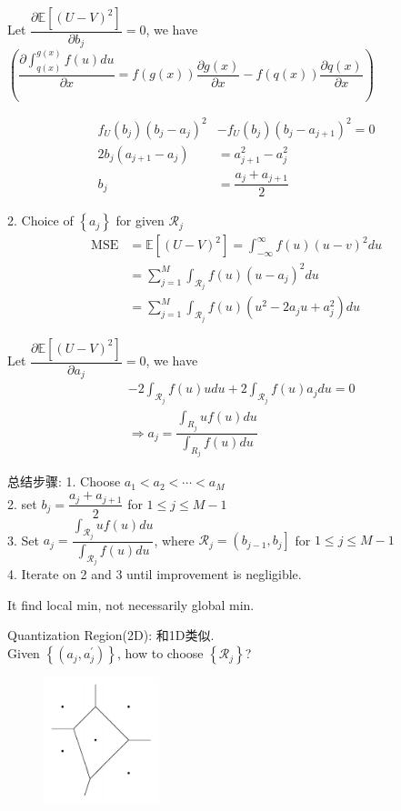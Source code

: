 Let $\dfrac{\partial \mathbb{E}\left[(U-V)^2\right]}{\partial b_j}=0$, we have $\left(\dfrac{\partial \int_{q(x)}^{g(x)} f(u) d u}{\partial x}=f(g(x)) \dfrac{\partial g(x)}{\partial x}-f(q(x)) \dfrac{\partial q(x)}{\partial x}\right)$

\begin{align*}
f_U\left(b_j\right)\left(b_j-a_j\right)^2 & -f_U\left(b_j\right)\left(b_j-a_{j+1}\right)^2=0 \\
2 b_j\left(a_{j+1}-a_j\right) & =a_{j+1}^2-a_j^2 \\
b_j & =\dfrac{a_j+a_{j+1}}{2}
\end{align*}

2. Choice of $\left\{a_j\right\}$ for given $\mathcal{R}_j$
\begin{align*}
\mathrm{MSE} &= \mathbb{E}\left[(U-V)^2\right]=\int_{-\infty}^{\infty} f(u)(u-v)^2 d u \\
&= \sum_{j=1}^M \int_{\mathcal{R}_j} f(u)\left(u-a_j\right)^2 d u \\
&= \sum_{j=1}^M \int_{\mathcal{R}_j} f(u)\left(u^2-2 a_j u+a_j^2\right) d u
\end{align*}

Let $\dfrac{\partial \mathbb{E}\left[(U-V)^2\right]}{\partial a_j}=0$, we have
\begin{align*}
& -2 \int_{\mathcal{R}_j} f(u) u d u+2 \int_{\mathcal{R}_j} f(u) a_j d u=0 \\
& \Longrightarrow a_j=\dfrac{\int_{R_j} u f(u) d u}{\int_{R_j} f(u) d u}
\end{align*}

总结步骤:
1. Choose $a_1<a_2<\cdots<a_M$ \\
2. set $b_j=\dfrac{a_j+a_{j+1}}{2}$ for $1 \leq j \leq M-1$ \\
3. Set $a_j=\dfrac{\int_{\mathcal{R}_j} u f(u) d u}{\int_{\mathcal{R}_j} f(u) d u}$, where $\mathcal{R}_j=\left(b_{j-1}, b_j\right]$ for $1 \leq j \leq M-1$ \\
4. Iterate on 2 and 3 until improvement is negligible.

It find local min, not necessarily global min.

\begin{example}
Quantization Region(2D): 和1D类似. \\
Given $\left\{\left(a_j, a_j^{\prime}\right)\right\}$, how to choose $\left\{\mathcal{R}_j\right\}$?
\begin{figure}[htbp]
    \centering
    \includegraphics[width=0.3\textwidth]{./figures/chapter8/2D_quantization.png}
\end{figure}
\end{example}

